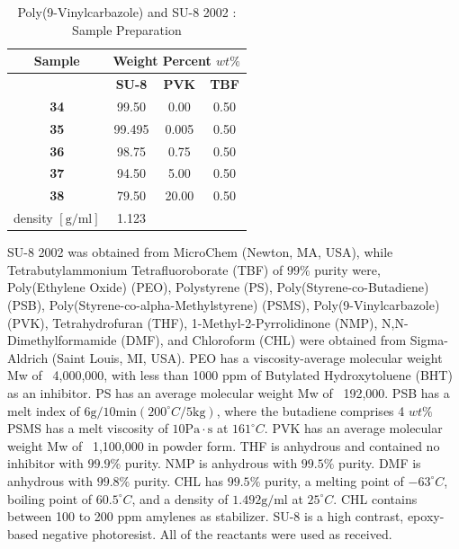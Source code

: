 \begin{table}[!th]
\centering
\caption[Poly(9-Vinylcarbazole) and SU-8 2002 : Sample Preparation]{Poly(9-Vinylcarbazole) and SU-8 2002 : Sample Preparation}
\begin{tabular}{cccc}
\hline
\textbf{Sample} & \multicolumn{3}{c}{\textbf{Weight Percent} $wt\%$} \\
\hline
{}          & \textbf{SU-8} & \textbf{PVK} & \textbf{TBF} \\
\textbf{34} & 99.50         &  0.00        & 0.50         \\
\textbf{35} & 99.495        &  0.005       & 0.50         \\
\textbf{36} & 98.75         &  0.75        & 0.50         \\
\textbf{37} & 94.50         &  5.00        & 0.50         \\
\textbf{38} & 79.50         & 20.00        & 0.50         \\
\hline
density $[\textrm{g} / \textrm{ml}]$
   & 1.123         & {}           & {}           \\
\hline
\end{tabular}
\label{tab:PVKinSU8}
\end{table}

\FloatBarrier %

SU-8 2002 was obtained from MicroChem (Newton, MA, USA), while Tetrabutylammonium Tetrafluoroborate (TBF) of $99\%$ purity were, Poly(Ethylene Oxide) (PEO), Polystyrene (PS), Poly(Styrene-co-Butadiene) (PSB), Poly(Styrene-co-alpha-Methylstyrene) (PSMS), Poly(9-Vinylcarbazole) (PVK), Tetrahydrofuran (THF), 1-Methyl-2-Pyrrolidinone (NMP), N,N-Dimethylformamide (DMF), and Chloroform (CHL) were obtained from Sigma-Aldrich (Saint Louis, MI, USA). PEO has a viscosity-average molecular weight Mw of ~4,000,000, with less than 1000 ppm of Butylated Hydroxytoluene (BHT) as an inhibitor. PS has an average molecular weight Mw of ~192,000. PSB has a melt index of $6 \textrm{g} / 10 \textrm{min} (200^{\circ}C / 5 \textrm{kg})$, where the butadiene comprises 4 $wt\%$ PSMS has a melt viscosity of $10 \textrm{Pa} \cdot \textrm{s}$ at $161^{\circ}C$. PVK has an average molecular weight Mw of ~1,100,000 in powder form. THF is anhydrous and contained no inhibitor with $99.9\%$ purity. NMP is anhydrous with $99.5\%$ purity. DMF is anhydrous with $99.8\%$ purity. CHL has $99.5\%$ purity, a melting point of $-63^{\circ}C$, boiling point of $60.5^{\circ}C$, and a density of $1.492 \textrm{g} / \textrm{ml}$ at $25^{\circ}C$. CHL contains between 100 to 200 ppm amylenes as stabilizer. SU-8 is a high contrast, epoxy-based negative photoresist. All of the reactants were used as received.

